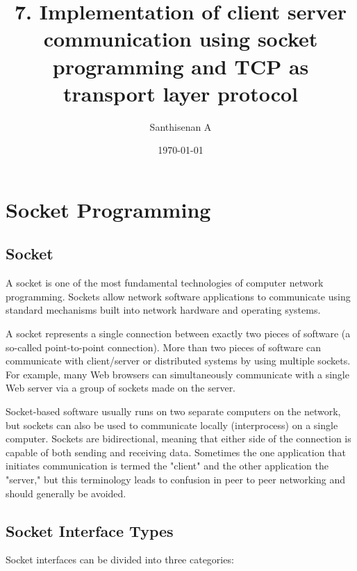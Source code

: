 \documentclass[a4paper,12pt]{article}
\begin{document}
\title{7. Implementation of client server communication using socket programming and TCP as transport layer protocol}
\author{Santhisenan A}
\date{\today}
\maketitle

\section{Socket Programming}

\subsection{Socket}
A socket is one of the most fundamental technologies of computer network programming. Sockets allow network software applications to communicate using standard mechanisms built into network hardware and operating systems.


A socket represents a single connection between exactly two pieces of software (a so-called point-to-point connection). More than two pieces of software can communicate with client/server or distributed systems by using multiple sockets. For example, many Web browsers can simultaneously communicate with a single Web server via a group of sockets made on the server.


Socket-based software usually runs on two separate computers on the network, but sockets can also be used to communicate locally (interprocess) on a single computer. Sockets are bidirectional, meaning that either side of the connection is capable of both sending and receiving data. Sometimes the one application that initiates communication is termed the "client" and the other application the "server," but this terminology leads to confusion in peer to peer networking and should generally be avoided.

\subsection{Socket Interface Types}

Socket interfaces can be divided into three categories:
\end{document}
